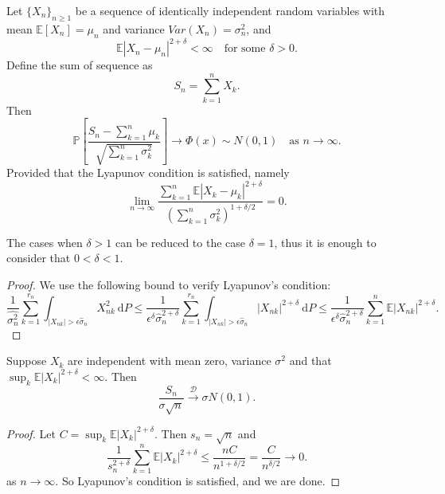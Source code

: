 \begin{theorem}
    Let $\{X_n\}_{n \geq 1}$ be a sequence of identically independent random variables with mean 
    $\mathbb{E}[X_n] = \mu_n$ and variance $Var(X_n) = \sigma^2_n$, and
    \[
        \mathbb{E}|X_n - \mu_n|^{2+\delta} < \infty \quad \text{for some } \delta > 0.
    \]
    Define the sum of sequence as
    \[
        S_n = \sum^n_{k=1} X_k.
    \]
    Then
    \begin{equation}
        \mathbb{P} \left[ \frac{S_n - \sum^n_{k=1} \mu_k}{\sqrt{\sum^n_{k=1} \sigma^2_k}}\right] \to \Phi(x) \sim N(0,1) \quad \text{as } n \to \infty.
    \end{equation}
    Provided that the Lyapunov condition is satisfied, namely
    \begin{equation}
        \lim_{n \to \infty} \frac{\sum^n_{k=1} \mathbb{E} |X_k - \mu_k|^{2+\delta}}{\left( \sum^n_{k=1} \sigma^2_k \right)^{1+\delta/2}} = 0.
    \end{equation}
\end{theorem}
The cases when $\delta > 1$ can be reduced to the case $\delta = 1$, thus it is enough to consider that $0< \delta <1$.
\begin{proof}
    We use the following bound to verify Lyapunov's condition:
    \[
        \frac{1}{\widehat{\sigma^2_n}} \sum^{r_n}_{k=1} \int_{|X_{nk}| > \epsilon \widehat{\sigma}_n} X^2_{nk} \> \mathrm{d}P 
        \leq \frac{1}{\epsilon^{\delta} \widehat{\sigma}^{2+\delta}_n} \sum^{r_n}_{k=1} \int_{|X_{nk}| > \epsilon \widehat{\sigma}_n} |X_{nk}|^{2+\delta} \> \mathrm{d}P 
        \leq \frac{1}{\epsilon^{\delta} \widehat{\sigma}^{2+\delta}_n} \sum^{n}_{k=1} \mathbb{E} |X_{nk}|^{2+\delta}.
    \]
\end{proof}
\begin{corollary}
    Suppose $X_k$ are independent with mean zero, variance $\sigma^2$ and that $\sup_k \mathbb{E}|X_k|^{2+\delta} < \infty$. Then 
    \[
        \frac{S_n}{\sigma \sqrt{n} } \xrightarrow[]{\mathcal{D}} \sigma N(0,1).
    \]
\end{corollary}
\begin{proof}
    Let $C = \sup_k \mathbb{E} |X_k|^{2+\delta}$. Then $s_n = \sqrt{n}$ and 
    \[
        \frac{1}{s^{2+\delta}_n} \sum^n_{k=1} \mathbb{E}|X_k|^{2+\delta} \leq \frac{nC}{n^{1+\delta/2}} = \frac{C}{n^{\delta/2}} \to 0.
    \]
    as $n \to \infty$. So Lyapunov's condition is satisfied, and we are done.
\end{proof}

